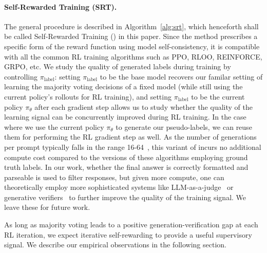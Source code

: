\paragraph{Self-Rewarded Training (SRT).} 
The general procedure is described in Algorithm~\ref{alg:srt}, which henceforth shall be called Self-Rewarded Training (\algo{}) in this paper. Since the method prescribes a specific form of the reward function using model self-consistency, it is compatible with all the common RL training algorithms such as PPO, RLOO, REINFORCE, GRPO, etc. We study the quality of generated labels during training by controlling $\pi_\text{label}$: setting $\pi_\text{label}$ to be the base model recovers our familar setting of learning the majority voting decisions of a fixed model (while still using the current policy's rollouts for RL training), and setting $\pi_\text{label}$ to be the current policy $\pi_\theta$ after each gradient step allows us to study whether the quality of the learning signal can be concurrently improved during RL training. In the case where we use the current policy $\pi_\theta$ to generate our pseudo-labels, we can reuse them for performing the RL gradient step as well. As the number of generations per prompt typically falls in the range 16-64~\citep{yu2025dapoopensourcellmreinforcement}, this variant of \algo{} incurs no additional compute cost compared to the versions of these algorithms employing ground truth labels. In our work, whether the final answer is correctly formatted and parseable is used to filter responses, but given more compute, one can theoretically employ more sophisticated systems like LLM-as-a-judge~\citep{zheng2023judgingllmasajudgemtbenchchatbot,gu2025surveyllmasajudge} or generative verifiers~\citep{zhang2025generativeverifiersrewardmodeling} to further improve the quality of the training signal. We leave these for future work.


As long as majority voting leads to a positive generation-verification gap at each RL iteration, we expect iterative self-rewarding to provide a useful supervisory signal. We describe our empirical observations in the following section.














